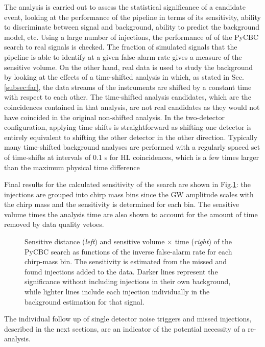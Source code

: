 \documentclass[binding=0.6cm, LaM]{sapthesis}
\begin{document}
	The analysis is carried out to assess the statistical significance of a candidate event, 
	looking at the performance of the pipeline in terms of its sensitivity, 
	ability to discriminate between signal and background, ability to predict the background model, etc. 
	Using a large number of injections, the performance of of the PyCBC search to real signals is checked.
 	The fraction of simulated signals that the pipeline is able to identify at a given false-alarm rate gives a measure of the sensitive volume.
        On the other hand, real data is used to study the background by looking at the effects of a time-shifted analysis in which, 
	as stated in Sec.\,\ref{subsec:far}, the data streams of the instruments are shifted by a constant time with respect to each other. 
	The time-shifted analysis candidates, which are the coincidences contained in that analysis, 
	are not real candidates as they would not have coincided in the original non-shifted analysis.
	In the two-detector configuration, applying time shifts is straightforward as shifting one detector 
	is entirely equivalent to shifting the other detector in the other direction. 
	Typically many time-shifted background analyses  are  performed with a regularly spaced set of time-shifts 
	at intervals of 0.1 s for HL coincidences, which is a few times larger than the maximum physical time difference

	Final results for the calculated sensitivity of the search are shown in  Fig.\ref{fig:sens_vt}: 
	the injections are grouped into chirp mass bins since the GW amplitude scales with the chirp mass 
	and the sensitivity is determined for each bin.
	The sensitive volume times the analysis time are also shown to account for the amount of time removed by data quality vetoes.
        \begin{figure}[t]
          \noindent
          \label{sens_vt}
          \centering
          \caption{ Sensitive distance (\textit{left}) and sensitive volume $\times$ time (\textit{right}) of the PyCBC search as functions of the inverse false-alarm rate for each chirp-mass bin. The sensitivity is estimated from the missed and found injections added to the data. Darker lines represent the significance without including injections in their own background, while lighter lines include each injection individually in the background estimation for that signal.}
          \label{fig:sens_vt}
        \end{figure}
	The individual follow up of single detector noise triggers and missed injections, 
	described in the next sections, are an indicator of the potential necessity of a re-analysis. 
\end{document}
